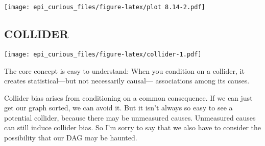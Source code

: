 \documentclass[
]{article}
\newenvironment{Shaded}{\begin{snugshade}}{\end{snugshade}}
\newcommand{\CommentTok}[1]{\textcolor[rgb]{0.56,0.35,0.01}{\textit{#1}}}
\newcommand{\DataTypeTok}[1]{\textcolor[rgb]{0.13,0.29,0.53}{#1}}
\newcommand{\DecValTok}[1]{\textcolor[rgb]{0.00,0.00,0.81}{#1}}
\newcommand{\FloatTok}[1]{\textcolor[rgb]{0.00,0.00,0.81}{#1}}
\newcommand{\KeywordTok}[1]{\textcolor[rgb]{0.13,0.29,0.53}{\textbf{#1}}}
\newcommand{\NormalTok}[1]{#1}
\newcommand{\OperatorTok}[1]{\textcolor[rgb]{0.81,0.36,0.00}{\textbf{#1}}}
\newcommand{\StringTok}[1]{\textcolor[rgb]{0.31,0.60,0.02}{#1}}
\begin{document}
\begin{Shaded}
\end{Shaded}

\texttt{[image: epi\_curious\_files/figure-latex/plot 8.14-2.pdf]}

\hypertarget{collider}{%
\subsection{COLLIDER}\label{collider}}

\texttt{[image: epi\_curious\_files/figure-latex/collider-1.pdf]}

The core concept is easy to understand: When you condition on a
collider, it creates statistical---but not necessarily causal---
associations among its causes.

Collider bias arises from conditioning on a common consequence. If we
can just get our graph sorted, we can avoid it. But it isn't always so
easy to see a potential collider, because there may be unmeasured
causes. Unmeasured causes can still induce collider bias. So I'm sorry
to say that we also have to consider the possibility that our DAG may be
haunted.
\end{document}
